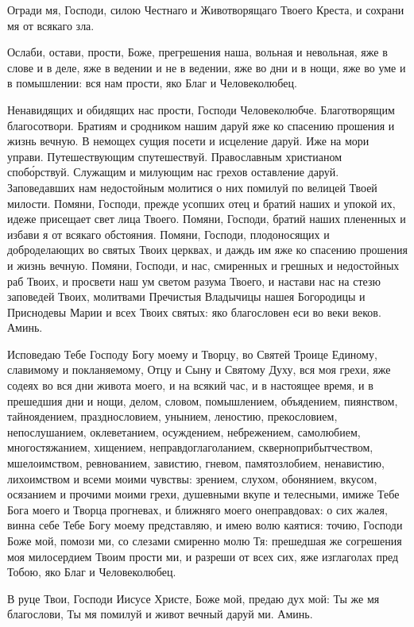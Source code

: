 \begin{mymulticols}

Огради мя, Господи, силою Честнаго и Животворящаго Твоего Креста, и сохрани мя от всякаго зла.


Ослаби, остави, прости, Боже, прегрешения наша, вольная и невольная, яже в слове и в деле, яже в ведении и не в ведении, яже во дни и в нощи, яже во уме и в помышлении: вся нам прости, яко Благ и Человеколюбец.


Ненавидящих и обидящих нас прости, Господи Человеколюбче. Благотворящим благосотвори. Братиям и сродником нашим даруй яже ко спасению прошения и жизнь вечную. В немощех сущия посети и исцеление даруй. Иже на мори управи. Путешествующим спутешествуй. Православным христианом споб\'{о}рствуй. Служащим и милующим нас грехов оставление даруй. Заповедавших нам недостойным молитися о них помилуй по велицей Твоей милости. Помяни, Господи, прежде усопших отец и братий наших и упокой их, идеже присещает свет лица Твоего. Помяни, Господи, братий наших плененных и избави я от всякаго обстояния. Помяни, Господи, плодоносящих и доброделающих во святых Твоих церквах, и даждь им яже ко спасению прошения и жизнь вечную. Помяни, Господи, и нас, смиренных и грешных и недостойных раб Твоих, и просвети наш ум светом разума Твоего, и настави нас на стезю заповедей Твоих, молитвами Пречистыя Владычицы нашея Богородицы и Приснодевы Марии и всех Твоих святых: яко благословен еси во веки веков. Аминь.


Исповедаю Тебе Господу Богу моему и Творцу, во Святей Троице Единому, славимому и покланяемому, Отцу и Сыну и Святому Духу, вся моя грехи, яже содеях во вся дни живота моего, и на всякий час, и в настоящее время, и в прешедшия дни и нощи, делом, словом, помышлением, объядением, пиянством, тайноядением, празднословием, унынием, леностию, прекословием, непослушанием, оклеветанием, осуждением, небрежением, самолюбием, многостяжанием, хищением, неправдоглаголанием, скверноприбытчеством, мшелоимством, ревнованием, завистию, гневом, памятозлобием, ненавистию, лихоимством и всеми моими чувствы: зрением, слухом, обонянием, вкусом, осязанием и прочими моими грехи, душевными вкупе и телесными, имиже Тебе Бога моего и Творца прогневах, и ближняго моего онеправдовах: о сих жалея, винна себе Тебе Богу моему представляю, и имею волю каятися: точию, Господи Боже мой, помози ми, со слезами смиренно молю Тя: прешедшая же согрешения моя милосердием Твоим прости ми, и разреши от всех сих, яже изглаголах пред Тобою, яко Благ и Человеколюбец.


В руце Твои, Господи Иисусе Христе, Боже мой, предаю дух мой: Ты же мя благослови, Ты мя помилуй и живот вечный даруй ми. Аминь.

\end{mymulticols}

